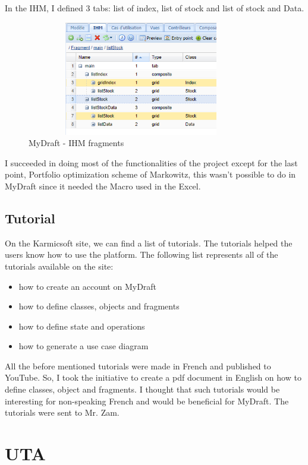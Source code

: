 \documentclass{report}
\begin{document}
In the IHM, I defined 3 tabs: list of index, list of stock and list of stock and Data.
\begin{figure}[H]
\centering
\includegraphics[width=10cm,height=5cm,keepaspectratio]{ihm.png}
\caption{MyDraft - IHM fragments}
\end{figure}

I succeeded in doing most of the functionalities of the project except for the last point, Portfolio optimization scheme of Markowitz, this wasn't possible to do in MyDraft since it needed the Macro used in the Excel.\\

\subsection{Tutorial}
On the Karmicsoft site, we can find a list of tutorials. The tutorials helped the users know how to use the platform. The following list represents all of the tutorials available on the site: \begin{itemize}
\item how to create an account on MyDraft 
\item how to define classes, objects and fragments
\item how to define state and operations
\item how to generate a use case diagram
\end{itemize}

All the before mentioned tutorials were made in French and published to YouTube. So, I took the initiative to create a pdf document in English on how to define classes, object and fragments. I thought that such tutorials would be interesting for non-speaking French and would be beneficial for MyDraft. The tutorials were sent to Mr. Zam.


\section{UTA}
\end{document}
